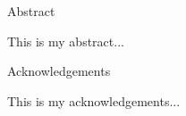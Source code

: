 \documentclass[a4paper, 12pt, oneside]{book}
\begin{document}
\pagebreak
\hspace{0pt}
\vfill %
    \begin{center}
    Abstract
    \end{center}
This is my abstract...
\vfill
\pagebreak

\pagebreak
\hspace{0pt}
\vfill 
    \begin{center}
    Acknowledgements
    \end{center}
This is my acknowledgements...

\vfill
\pagebreak


\tableofcontents
\listoffigures 
\listoftables

\clearpage









\printbibliography


\end{document}
